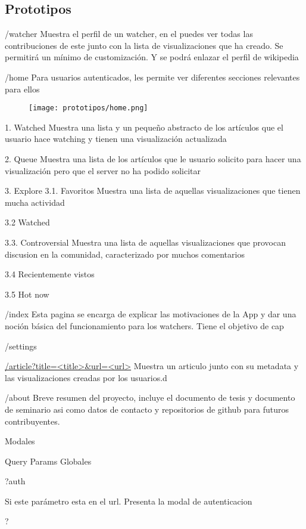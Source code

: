 \subsection{Prototipos}


/watcher
Muestra el perfil de un watcher, en el puedes ver todas las contribuciones de este junto con la lista de visualizaciones que ha creado.
Se permitirá un mínimo de customización. Y se podrá enlazar el perfil de wikipedia


/home
Para usuarios autenticados, les permite ver diferentes secciones relevantes para ellos

\begin{figure}
    \texttt{[image: prototipos/home.png]}
\end{figure}



1. Watched
    Muestra una lista y un pequeño abstracto de los artículos que el usuario hace watching y tienen una visualización actualizada

2. Queue
    Muestra una lista de los artículos que le usuario solicito para hacer una visualización pero que el server no ha podido solicitar

3. Explore
    3.1. Favoritos
    Muestra una lista de aquellas visualizaciones que tienen mucha actividad 

    3.2 Watched
    
    3.3. Controversial
    Muestra una lista de aquellas visualizaciones que provocan discusion en la comunidad, caracterizado por muchos comentarios

    3.4 Recientemente vistos

    3.5 Hot now


/index
Esta pagina se encarga de explicar las motivaciones de la App y dar una noción básica del funcionamiento para los watchers.
Tiene el objetivo de cap


/settings



\url{/article?title=<title>&url=<url>}
Muestra un articulo junto con su metadata y las visualizaciones creadas por los usuarios.d



/about
Breve resumen del proyecto, incluye el documento de tesis y documento de seminario asi como datos de contacto y repositorios de github para futuros contribuyentes.

Modales

Query Params Globales

?auth

Si este parámetro esta en el url. Presenta la modal de autenticacion 

?

